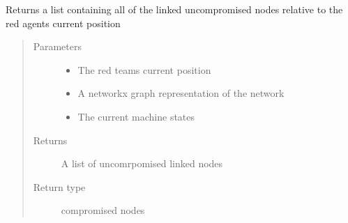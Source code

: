 \documentclass[letterpaper,10pt,english]{sphinxmanual}
\begin{document}
\begin{fulllineitems}
\label{\detokenize{source/yawning_titan.envs.specific.core:yawning_titan.envs.specific.core.node_states.get_linked_uncompromised_nodes}}
\sphinxAtStartPar
Returns a list containing all of the linked uncompromised nodes relative
to the red agents current position
\begin{quote}\begin{description}
\item[{Parameters}] \leavevmode\begin{itemize}
\item {}
\sphinxAtStartPar
{} \textendash{} The red teams current position

\item {}
\sphinxAtStartPar
{} \textendash{} A networkx graph representation of the network

\item {}
\sphinxAtStartPar
{} \textendash{} The current machine states

\end{itemize}

\item[{Returns}] \leavevmode
\sphinxAtStartPar
A list of uncomrpomised linked nodes

\item[{Return type}] \leavevmode
\sphinxAtStartPar
compromised nodes

\end{description}\end{quote}

\end{fulllineitems}

\end{document}
